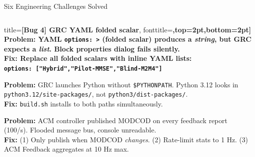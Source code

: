 \documentclass[aspectratio=169,10pt]{beamer}
\begin{document}
\begin{frame}[shrink=22]{Six Engineering Challenges Solved}
\begin{columns}[T]
\begin{column}{0.46\textwidth}
\begin{tcolorbox}
                        title={\scriptsize\bfseries [Bug 4] GRC YAML folded scalar},
                        fonttitle=\bfseries\scriptsize,top=2pt,bottom=2pt]
        \scriptsize \textbf{Problem:} YAML \texttt{options: >} (folded scalar) produces a
        \emph{string}, but GRC expects a \emph{list}. Block properties dialog fails silently.\\
        \textbf{Fix:} Replace all folded scalars with inline YAML lists:\\
        \texttt{options: ["Hybrid","Pilot-MMSE","Blind-M2M4"]}
      \end{tcolorbox}
      \vspace{0.2em}
      \begin{tcolorbox}[colback=NUSorange!5,colframe=NUSorange,arc=3pt,left=4pt,right=4pt,
                        title={\scriptsize\bfseries [Bug 5] Python module discovery by GRC},
                        fonttitle=\bfseries\scriptsize,top=2pt,bottom=2pt]
        \scriptsize \textbf{Problem:} GRC launches Python without \texttt{\$PYTHONPATH}.
        Python 3.12 looks in \texttt{python3.12/site-packages/}, not
        \texttt{python3/dist-packages/}.\\
        \textbf{Fix:} \texttt{build.sh} installs to both paths simultaneously.
      \end{tcolorbox}
      \vspace{0.2em}
      \begin{tcolorbox}[colback=NUSorange!5,colframe=NUSorange,arc=3pt,left=4pt,right=4pt,
                        title={\scriptsize\bfseries [Bug 6] Message port flooding},
                        fonttitle=\bfseries\scriptsize,top=2pt,bottom=2pt]
        \scriptsize \textbf{Problem:} ACM controller published MODCOD on every feedback
        report (100/s). Flooded message bus, console unreadable.\\
        \textbf{Fix:} (1) Only publish when MODCOD \emph{changes}.
        (2) Rate-limit stats to 1 Hz.
        (3) ACM Feedback aggregates at 10 Hz max.
      \end{tcolorbox}
    \end{column}
  \end{columns}
\end{frame}
\end{document}
